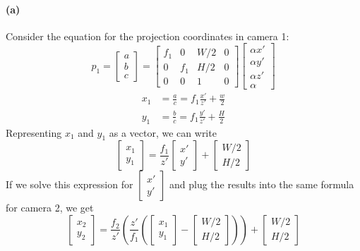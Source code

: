 \documentclass{article}
\newcommand{\spart}[1]{\paragraph{(#1)}}
\begin{document}
\spart{a} Consider the equation for the projection coordinates in camera 1:
\begin{equation}
p_1 = 
\begin{bmatrix}
a \\ b \\ c
\end{bmatrix}
=  
\begin{bmatrix}
f_1 & 0 & W/2 & 0 \\
0 & f_1 & H/2 & 0 \\
0 & 0 & 1 & 0
\end{bmatrix}
\begin{bmatrix}
\alpha x' \\ \alpha y' \\ \alpha z' \\ \alpha
\end{bmatrix}
\end{equation}
\begin{align}
x_1 &= \frac{a}{c} = f_1\frac{x'}{z'} + \frac{w}{2} \\
y_1 &= \frac{b}{c} = f_1\frac{y'}{z'} + \frac{H}{2}
\end{align}
Representing $x_1$ and $y_1$ as a vector, we can write
\begin{equation}
\begin{bmatrix}
x_1 \\ y_1 
\end{bmatrix}
= \frac{f_1}{z'}
\begin{bmatrix}
x' \\ y'
\end{bmatrix}
+
\begin{bmatrix}
W/2 \\ H/2
\end{bmatrix}
\end{equation}
If we solve this expression for $\begin{bmatrix} x' \\ y' \end{bmatrix}$ and plug the results into the same formula for camera 2, we get
\begin{equation}
\begin{bmatrix} x_2 \\ y_2 \end{bmatrix}
= \frac{f_2}{z'} \left( \frac{z'}{f_1} \left(
\begin{bmatrix} x_1 \\ y_1 \end{bmatrix}
-
\begin{bmatrix} W/2 \\ H/2 \end{bmatrix}
\right) \right) +
\begin{bmatrix} W/2 \\ H/2 \end{bmatrix}
\end{equation}
\end{document}
